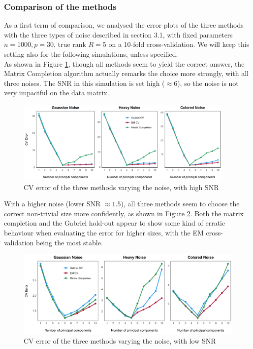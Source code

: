 \documentclass{article}
\begin{document}
\subsubsection{Comparison of the methods}
As a first term of comparison, we analysed the error plots of the three 
methods with the three types of noise described in section 3.1, with fixed 
parameters $n=1000, p=30$, true rank $R = 5$ on a 10-fold cross-validation. 
We will keep this setting also for the following simulations, unless specified. \\
As shown in Figure \ref{fig:CV_error}, though all methods seem to yield the 
correct answer, the Matrix Completion algorithm actually remarks the choice 
more strongly, with all three noises. The SNR in this simulation is set high 
($\approx 6$), so the noise is not very impactful on the data matrix.
\begin{figure}[h!]
    \centering
    \includegraphics[width=0.95\textwidth]{CVplots.png}
    \caption{CV error of the three methods varying the noise, with high SNR}
    \label{fig:CV_error}
\end{figure}
With a higher noise (lower SNR $\approx 1.5$), all three methods seem to choose the correct non-trivial size more confidently,
as shown in Figure \ref{fig:CV_error_high}. Both the matrix completion and the Gabriel hold-out appear to show
some kind of erratic behaviour when evaluating the error for higher sizes, with the EM cross-validation being 
the most stable.

\begin{figure}[h!]
    \centering
    \includegraphics[width=\textwidth]{CVplots_highnoise.png}
    \caption{CV error of the three methods varying the noise, with low SNR}
    \label{fig:CV_error_high}
\end{figure}
\end{document}

